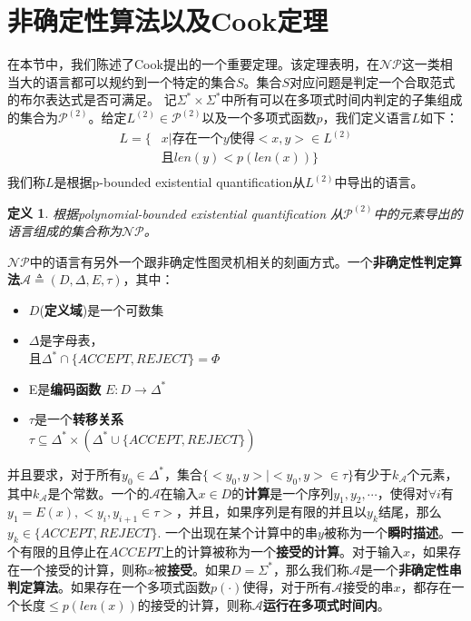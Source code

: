 \documentclass[twocolumn]{article}
\newtheorem{definition}{\hspace{2em}定义}
\theoremstyle{nonumberplain}%
\begin{document}
\section{非确定性算法以及Cook定理}
    在本节中，我们陈述了Cook提出的一个重要定理。该定理表明，在$\mathcal{NP}$这一类相当大的语言都可以规约到一个特定的集合$S$。集合$S$对应问题是判定一个合取范式的布尔表达式是否可满足。
    记$\Sigma^*\times\Sigma^*$中所有可以在多项式时间内判定的子集组成的集合为$\mathcal{P}^{(2)}$。给定$L^{(2)}\in \mathcal{P}^{(2)}$以及一个多项式函数$p$，我们定义语言$L$如下：
    \begin{equation}\nonumber
        \begin{aligned}
            L=\{&x|\text{存在一个}y\text{使得}<x,y>\in L^{(2)} \\
                &\text{且}len(y)<p(len(x))\} \\
        \end{aligned}
    \end{equation}
    我们称$L$是根据p-bounded existential quantification从$L^{(2)}$中导出的语言。

    \begin{definition}
        根据polynomial-bounded existential quantification 从$\mathcal{P}^{(2)}$中的元素导出的语言组成的集合称为$\mathcal{NP}$。
    \end{definition}

    $\mathcal{NP}$中的语言有另外一个跟非确定性图灵机相关的刻画方式。一个{\bf 非确定性判定算法}$\mathcal{A}\triangleq(D,\Delta,E,\tau)$，其中：
    \begin{itemize}
    \item $D$({\bf 定义域})是一个可数集
    \item $\Delta$是字母表， \\
        且$\Delta^*\cap \{ACCEPT,REJECT\}=\Phi$
    \item E是{\bf 编码函数} $E:D\rightarrow\Delta^*$
    \item $\tau$是一个{\bf 转移关系} \\
        $\tau\subseteq\Delta^*\times(\Delta^*\cup \{ACCEPT,REJECT\})$
    \end{itemize}
    并且要求，对于所有$y_0 \in \Delta^*$，集合$\{<y_0,y>|<y_0,y>\in \tau\}$有少于$k_\mathcal{A}$个元素，其中$k_\mathcal{A}$是个常数。一个的$\mathcal{A}$在输入$x\in D$的{\bf 计算}是一个序列$y_1,y_2,\cdots$，使得对$\forall i$有$y_1=E(x),<y_i,y_{i+1}\in\tau>$，并且，如果序列是有限的并且以$y_k$结尾，那么$y_k \in \{ACCEPT,REJECT\}$. 一个出现在某个计算中的串$y$被称为一个{\bf 瞬时描述}。一个有限的且停止在$ACCEPT$上的计算被称为一个{\bf 接受的计算}。对于输入$x$，如果存在一个接受的计算，则称$x$被{\bf 接受}。如果$D=\Sigma^*$，那么我们称$\mathcal{A}$是一个{\bf 非确定性串判定算法}。如果存在一个多项式函数$p(\cdot)$使得，对于所有$\mathcal{A}$接受的串$x$，都存在一个长度$\leq p(len(x))$的接受的计算，则称$\mathcal{A}${\bf 运行在多项式时间内}。
\end{document}

